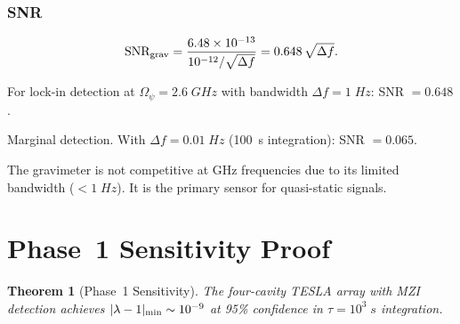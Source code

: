 \documentclass[aps,prd,twocolumn,superscriptaddress,nofootinbib]{revtex4-2}
\newcommand{\ee}[1]{\times 10^{#1}}
\newtheorem{theorem}{Theorem}
\begin{document}
\subsubsection{SNR}

\begin{equation}
\text{SNR}_{\rm grav} = \frac{6.48\ee{-13}}{10^{-12}/\sqrt{\Delta f}} = 0.648\,\sqrt{\Delta f}.
\end{equation}

For lock-in detection at $\Omega_\psi = 2.6\;\si{GHz}$ with
bandwidth $\Delta f = 1\;\si{Hz}$: SNR $= 0.648$.

Marginal detection.  With $\Delta f = 0.01\;\si{Hz}$
(100~s integration): SNR $= 0.065$.

The gravimeter is not competitive at GHz frequencies due to
its limited bandwidth ($< 1\;\si{Hz}$).  It is the
primary sensor for quasi-static signals.

\section{Phase~1 Sensitivity Proof}
\label{sec:sensitivity-proof}

\begin{theorem}[Phase~1 Sensitivity]
The four-cavity TESLA array with MZI detection achieves
$|\lambda-1|_{\rm min} \sim 10^{-9}$ at 95\% confidence
in $\tau = 10^3\;\si{s}$ integration.
\end{theorem}
\end{document}
